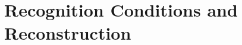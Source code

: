 \documentclass{article}
\theoremstyle{plain}
\theoremstyle{definition}
\theoremstyle{remark}
\newcommand{\<}{\langle}
\renewcommand{\>}{\rangle}
\begin{document}

\section{Recognition Conditions and Reconstruction}
\end{document}

